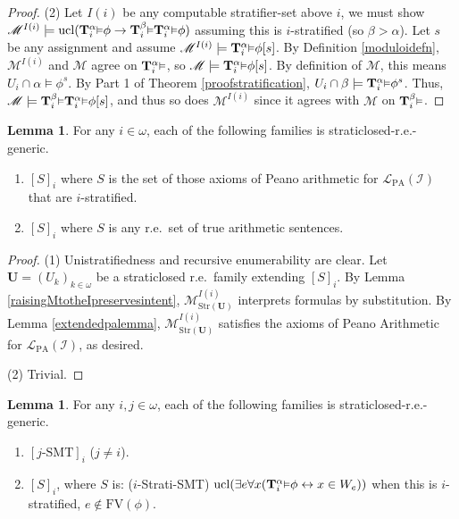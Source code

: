 \documentclass[reqno]{article}
\theoremstyle{definition}
\newtheorem{lemma}[theorem]{Lemma}
\def\L{\mathscr{L}}
\def\M{\mathscr{M}}
\def\T{\mathbf{T}}
\def\U{\mathbf{U}}
\def\FV{\mathrm{FV}}
\def\LPA{\L_{\mathrm{PA}}}
\def\indset{\mathcal I}
\newcommand{\Prr}[2]{\T^{#1}_{#2}\mbox{\small${\vDash}$}}
\newcommand{\ucl}[1]{\mathrm{ucl}(#1)}
\newcommand{\str}[1]{\mathrm{Str}(#1)} \newcommand{\Str}[1]{\str{#1}}
\begin{document}
\begin{proof}
\item
(2)
Let $I(i)$ be any computable stratifier-set above $i$,
we must show $\M^{I(i)}\models
\ucl{\Prr\alpha i\phi\rightarrow\Prr\beta i\Prr\alpha i\phi}$
assuming this is $i$-stratified (so $\beta>\alpha$).
Let $s$ be any assignment and assume $\M^{I(i)}\models\Prr\alpha i\phi[s]$.
By Definition \ref{moduloidefn}, $\M^{I(i)}$ and $\M$ agree on $\Prr\alpha i$,
so $\M\models\Prr\alpha i\phi[s]$.
By definition of $\M$, this means $U_i\cap\alpha\models \phi^s$.
By Part 1 of Theorem \ref{proofstratification},
$U_i\cap\beta\models \Prr\alpha i\phi^s$.
Thus, $\M\models \Prr\beta i\Prr\alpha i\phi[s]$,
and thus so does $\M^{I(i)}$ since it agrees with $\M$ on $\Prr\beta i$.
\end{proof}

\begin{lemma}
\label{secondutilbagarithmetic}
For any $i\in\omega$, each of the following families is straticlosed-r.e.-generic.
\begin{enumerate}
\item $[S]_i$ where $S$ is the set of those axioms of Peano arithmetic for
$\LPA(\indset)$ that are $i$-stratified.
\item $[S]_i$ where $S$ is any r.e.~set of true arithmetic sentences.
\end{enumerate}
\end{lemma}

\begin{proof}
\item
(1)
Unistratifiedness and recursive enumerability are clear.
Let $\U=(U_k)_{k\in\omega}$ be a straticlosed r.e.~family
extending $[S]_i$.
By Lemma \ref{raisingMtotheIpreservesintent}, $\M^{I(i)}_{\str\U}$ interprets formulas
by substitution. By Lemma \ref{extendedpalemma}, $\M^{I(i)}_{\str\U}$ satisfies the axioms
of Peano Arithmetic for $\LPA(\indset)$, as desired.

\item
(2)
Trivial.
\end{proof}

\begin{lemma}
\label{secondutilbagsmt}
For any $i,j\in\omega$, each of the following families is straticlosed-r.e.-generic.
\begin{enumerate}
\item $[\mbox{$j$-SMT}]_i$ ($j\not=i$).
\item $[S]_i$, where $S$ is: ($i$-Strati-SMT)
$\ucl{\exists e\forall x(\Prr\alpha i\phi\leftrightarrow x\in W_e)}$
when this is $i$-stratified, $e\not\in\FV(\phi)$.
\end{enumerate}
\end{lemma}
\end{document}
